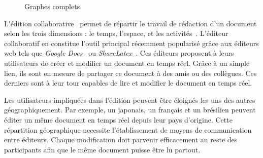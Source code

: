 




\begin{figure}
  \begin{center}
    
    \caption[Graphes complets]{\label{net:fig:completegraph}Graphes complets.}
  \end{center}
\end{figure}

\lettrine{L}'édition collaborative~\cite{ellis1991groupware} permet de répartir
le travail de rédaction d'un document selon les trois dimensions : le temps,
l'espace, et les activités~\cite{desanctis1987foundation,
  grudin1994computersupported, johansen1988groupware}. L'éditeur collaboratif en
constitue l'outil principal récemment popularisé grâce aux éditeurs web tels que
\emph{Google Docs}~\cite{googledocs} ou \emph{ShareLatex}~\cite{sharelatex}. Ces
éditeurs proposent à leurs utilisateurs de créer et modifier un document en
temps réel. Grâce à un simple lien, ils sont en mesure de partager ce document à
des amis ou des collègues. Ces derniers sont à leur tour capables de lire et
modifier le document en temps réel.

Les utilisateurs impliquées dans l'édition peuvent être éloignés les uns des
autres géographiquement. Par exemple, un japonais, un français et un brésilien
peuvent éditer un même document en temps réel depuis leur pays d'origine. Cette
répartition géographique necessite l'établissement de moyens de communication
entre éditeurs.
Chaque modification doit parvenir efficacement au reste des participants afin
que le même document puisse être lu partout.

